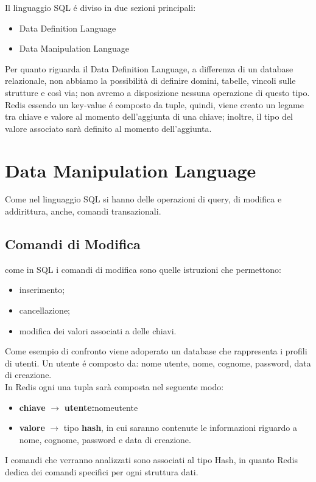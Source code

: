 Il linguaggio SQL é diviso in due sezioni principali:
\begin{itemize}
    \item Data Definition Language
    \item Data Manipulation Language
\end{itemize}

Per quanto riguarda il Data Definition Language, a differenza di un database relazionale, non abbiamo la possibilità di definire
domini, tabelle, vincoli sulle strutture e così via; non avremo a disposizione nessuna operazione di questo tipo.\\
Redis essendo un key-value é composto da tuple, quindi, viene creato un legame tra chiave e valore al momento dell'aggiunta di una chiave; inoltre, il tipo del valore
associato sarà definito al momento dell'aggiunta.
\section{Data Manipulation Language}
Come nel linguaggio SQL si hanno delle operazioni di query, di modifica e addirittura, anche, comandi transazionali.

\subsection{Comandi di Modifica}
come in SQL i comandi di modifica sono quelle istruzioni che permettono:
\begin{itemize}
    \item inserimento;
    \item cancellazione;
    \item modifica dei valori associati a delle chiavi.\\
\end{itemize}


Come esempio di confronto viene adoperato un database che rappresenta i profili di utenti.
Un utente é composto da: nome utente, nome, cognome, password, data di creazione.\\

In Redis ogni una tupla sarà composta nel seguente modo:
\begin{itemize}
    \item \textbf{chiave} $\to$ \textbf{utente:}nomeutente
    \item \textbf{valore} $\to$ tipo \textbf{hash}, in cui saranno contenute le informazioni riguardo a nome, cognome, password e data di creazione.
\end{itemize}
I comandi che verranno analizzati sono associati al tipo Hash, in quanto Redis dedica dei comandi specifici per ogni struttura dati.\\

